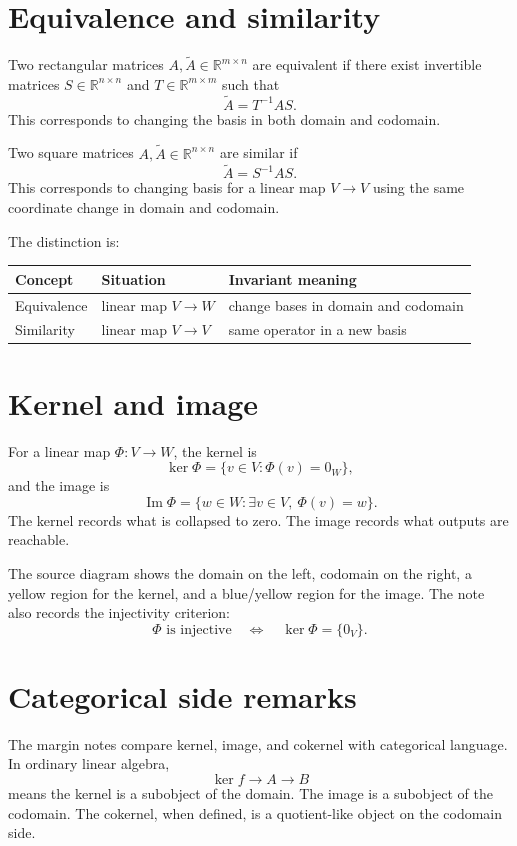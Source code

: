 \section{Equivalence and similarity}

Two rectangular matrices $A,\widetilde A\in\mathbb R^{m\times n}$ are equivalent if there exist invertible matrices $S\in\mathbb R^{n\times n}$ and $T\in\mathbb R^{m\times m}$ such that
\[
  \widetilde A=T^{-1}AS.
\]
This corresponds to changing the basis in both domain and codomain.

Two square matrices $A,\widetilde A\in\mathbb R^{n\times n}$ are similar if
\[
  \widetilde A=S^{-1}AS.
\]
This corresponds to changing basis for a linear map $V\to V$ using the same coordinate change in domain and codomain.

The distinction is:
\begin{center}
\begin{tabular}{lll}
\toprule
Concept & Situation & Invariant meaning \\
\midrule
Equivalence & linear map $V\to W$ & change bases in domain and codomain \\
Similarity & linear map $V\to V$ & same operator in a new basis \\
\bottomrule
\end{tabular}
\end{center}

\section{Kernel and image}

For a linear map $\Phi:V\to W$, the kernel is
\[
  \ker \Phi=\{v\in V:\Phi(v)=0_W\},
\]
and the image is
\[
  \operatorname{Im}\Phi=\{w\in W:\exists v\in V,\ \Phi(v)=w\}.
\]
The kernel records what is collapsed to zero.  The image records what outputs are reachable.

The source diagram shows the domain on the left, codomain on the right, a yellow region for the kernel, and a blue/yellow region for the image.  The note also records the injectivity criterion:
\[
  \Phi\text{ is injective}\quad\Longleftrightarrow\quad\ker \Phi=\{0_V\}.
\]

\section{Categorical side remarks}

The margin notes compare kernel, image, and cokernel with categorical language.  In ordinary linear algebra,
\[
  \ker f\to A\to B
\]
means the kernel is a subobject of the domain.  The image is a subobject of the codomain.  The cokernel, when defined, is a quotient-like object on the codomain side.

